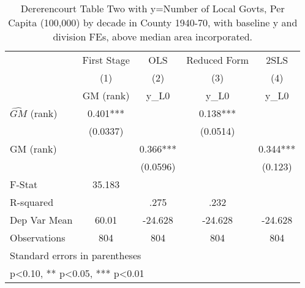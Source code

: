 \begin{table}[htbp]\centering
\def\sym#1{\ifmmode^{#1}\else\(^{#1}\)\fi}
\caption{Dererencourt Table Two with y=Number of Local Govts, Per Capita (100,000) by decade in County 1940-70, with baseline y and division FEs, above median area incorporated.}
\begin{tabular}{l*{4}{c}}
\toprule
                    & First Stage   &         OLS   &Reduced Form   &        2SLS   \\
                    &\multicolumn{1}{c}{(1)}&\multicolumn{1}{c}{(2)}&\multicolumn{1}{c}{(3)}&\multicolumn{1}{c}{(4)}\\
                    &\multicolumn{1}{c}{GM  (rank)}&\multicolumn{1}{c}{y\_L0}&\multicolumn{1}{c}{y\_L0}&\multicolumn{1}{c}{y\_L0}\\
\midrule
$\hat{GM}$ (rank)   &       0.401***&               &       0.138***&               \\
                    &    (0.0337)   &               &    (0.0514)   &               \\
\addlinespace
GM  (rank)          &               &       0.366***&               &       0.344***\\
                    &               &    (0.0596)   &               &     (0.123)   \\
\midrule
F-Stat              &      35.183   &               &               &               \\
R-squared           &               &        .275   &        .232   &               \\
Dep Var Mean        &       60.01   &     -24.628   &     -24.628   &     -24.628   \\
Observations        &         804   &         804   &         804   &         804   \\
\bottomrule
\multicolumn{5}{l}{\footnotesize Standard errors in parentheses}\\
\multicolumn{5}{l}{\footnotesize * p<0.10, ** p<0.05, *** p<0.01}\\
\end{tabular}
\end{table}
